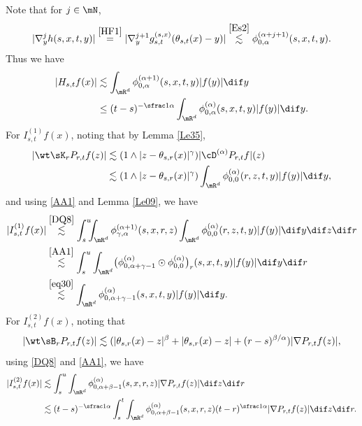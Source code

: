 \step\label{Step 2}
Note that for $j\in\mN$,
\begin{equation}
|\nabla^j_yh(s,x,t,y)|\stackrel{\eqref{HF1}}{=}|\nabla_{y}^{j+1} g^{(s,x)}_{s,t}(\theta_{s,t}(x)-y)|
\stackrel{\eqref{Es2}}{\lesssim}\phi^{(\alpha+j+1)}_{0,\alpha}(s,x,t,y).\label{DQ8}
\end{equation}
Thus we have
\begin{align*}
|H_{s,t}f(x)|&\lesssim\int_{\mR^d}\phi^{(\alpha+1)}_{0,\alpha}(s,x,t,y)|f(y)|\dif y\\
&\leq (t-s)^{-\sfrac1\alpha}\int_{\mR^d}\phi^{(\alpha)}_{0,\alpha}(s,x,t,y)|f(y)|\dif y.
\end{align*}
For $I^{(1)}_{s,t} f(x)$, noting that by Lemma \ref{Le35},
\begin{align*}
|\wt\sK_r P_{r,t}f(z)|&\lesssim (1\wedge|z-\theta_{s,r}(x)|^{\gamma})|\cD^{(\alpha)}P_{r,t}f|(z)\\
&\lesssim (1\wedge|z-\theta_{s,r}(x)|^{\gamma})\int_{\mR^d}\phi^{(\alpha)}_{0,0}(r,z,t,y)|f(y)|\dif y,
\end{align*}
and using \eqref{AA1} and Lemma \ref{Le09}, we have
\begin{align*}
|I^{(1)}_{s,t} f(x)|&\stackrel{\eqref{DQ8}}{\lesssim}\int^{u}_s\!\!\!\int_{\mR^d}\phi^{(\alpha+1)}_{\gamma,\alpha}(s,x,r,z)
\int_{\mR^d}\phi^{(\alpha)}_{0,0}(r,z,t,y)|f(y)|\dif y\dif z\dif r\\
&\stackrel{\eqref{AA1}}{\lesssim}\int^{u}_s\int_{\mR^d}
\bigl(\phi^{(\alpha)}_{0,\alpha+\gamma-1}\odot\phi^{(\alpha)}_{0,0}\bigr)_r(s,x,t,y)|f(y)|\dif y\dif r\\
&\stackrel{\eqref{eq30}}{\lesssim}\int_{\mR^d}\phi^{(\alpha)}_{0,\alpha+\gamma-1}(s,x,t,y)|f(y)|\dif y.
\end{align*}
For $I^{(2)}_{s,t} f(x)$, noting that
\[
|\wt\sB_r P_{r,t}f(z)|\lesssim (|\theta_{s,r}(x)-z|^\beta+|\theta_{s,r}(x)-z|+(r-s)^{\beta/\alpha})|\nabla P_{r,t}f(z)|,
\]
using \eqref{DQ8} and \eqref{AA1}, we have
\begin{align*}
|I^{(2)}_{s,t} f(x)|&\lesssim\int^{u}_s\int_{\mR^d}\phi^{(\alpha)}_{0,\alpha+\beta-1}(s,x,r,z)|\nabla P_{r,t}f(z)|\dif z\dif r\\
&\lesssim(t-s)^{-\sfrac1\alpha}\int^t_s\int_{\mR^d}\phi^{(\alpha)}_{0,\alpha+\beta-1}(s,x,r,z)(t-r)^{\sfrac1\alpha}|\nabla P_{r,t}f(z)|\dif z\dif r.
\end{align*}

